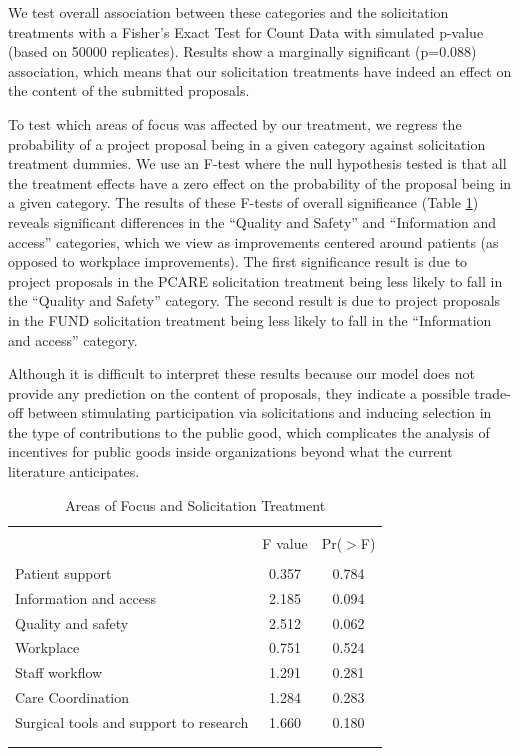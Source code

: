 \documentclass[12pt, titlepage]{article}
\begin{document}
We test overall association between these categories and the
solicitation treatments with a Fisher's Exact Test for Count Data with
simulated p-value (based on 50000 replicates). Results show a marginally
significant (p=0.088) association, which means that our solicitation
treatments have indeed an effect on the content of the submitted
proposals.

To test which areas of focus was affected by our treatment, we regress
the probability of a project proposal being in a given category against
solicitation treatment dummies. We use an F-test where the null
hypothesis tested is that all the treatment effects have a zero effect
on the probability of the proposal being in a given category. The
results of these F-tests of overall significance (Table
\ref{areas of focus}) reveals significant differences in the ``Quality
and Safety'' and ``Information and access'' categories, which we view as
improvements centered around patients (as opposed to workplace
improvements). The first significance result is due to project proposals
in the PCARE solicitation treatment being less likely to fall in the
``Quality and Safety'' category. The second result is due to project
proposals in the FUND solicitation treatment being less likely to fall
in the ``Information and access'' category.

Although it is difficult to interpret these results because our model
does not provide any prediction on the content of proposals, they
indicate a possible trade-off between stimulating participation via
solicitations and inducing selection in the type of contributions to the
public good, which complicates the analysis of incentives for public
goods inside organizations beyond what the current literature
anticipates.

\begin{table}
\centering
\caption{Areas of Focus and Solicitation Treatment}
\label{areas of focus}
\begin{tabular}{@{}lcc}
  \\[-1.8ex]\hline \hline \\[-1.8ex]
 & F value & Pr($>$F) \\ 
  \hline \\[-1.86ex]
Patient support & 0.357 & 0.784 \\ 
  Information and access & 2.185 & 0.094 \\ 
  Quality and safety  & 2.512 & 0.062 \\ 
  Workplace & 0.751 & 0.524 \\ 
  Staff workflow & 1.291 & 0.281 \\ 
  Care Coordination & 1.284 & 0.283 \\ 
  Surgical tools and support to research & 1.660 & 0.180 \\ 
   \\[-1.8ex]\hline \hline \\[-1.8ex]
\end{tabular}
\end{table}
\end{document}
